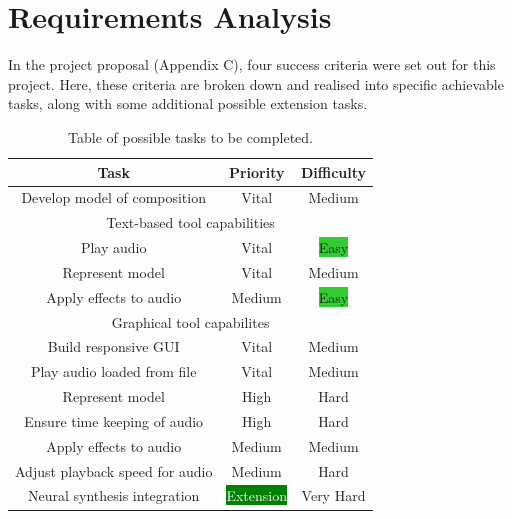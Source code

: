 \documentclass[12pt,a4paper,oneside,openright]{report}
\newcommand{\vital}{\colorbox{BrickRed}{Vital}}
\newcommand{\veryhard}{\colorbox{BrickRed}{Very Hard}}
\newcommand{\hard}{\colorbox{RedOrange}{Hard}}
\newcommand{\high}{\colorbox{RedOrange}{High}}
\newcommand{\medium}{\colorbox{Dandelion}{Medium}}
\newcommand{\easy}{\colorbox{LimeGreen}{Easy}}
\newcommand{\extension}{\colorbox{Green}{\textcolor{White}{Extension}}}
\begin{document}
\section{Requirements Analysis}\label{sec:req_anal}
In the project proposal (Appendix C), four success criteria were set out for this project. Here, these criteria are broken down and realised into specific achievable tasks, along with some additional possible extension tasks.

\begin{table}[h]
    \centering
    \begin{tabular}{|c|c|c|}
        \hline
         Task & Priority & Difficulty \\
         \hline
         Develop model of composition & \vital & \medium \\
         \hline
         \multicolumn{3}{|c|}{Text-based tool capabilities} \\
         \hline
         Play audio & \vital & \easy \\
         Represent model & \vital & \medium \\
         Apply effects to audio & \medium & \easy \\
         \hline
         \multicolumn{3}{|c|}{Graphical tool capabilites} \\
         \hline
         Build responsive GUI & \vital & \medium \\
         Play audio loaded from file & \vital & \medium \\
         Represent model & \high & \hard \\
         Ensure time keeping of audio & \high & \hard \\
         Apply effects to audio & \medium & \medium \\
         Adjust playback speed for audio & \medium & \hard \\
         Neural synthesis integration & \extension & \veryhard \\
         \hline
    \end{tabular}
    \caption{Table of possible tasks to be completed.}
    \label{tab:req_anal}
\end{table}
\end{document}
